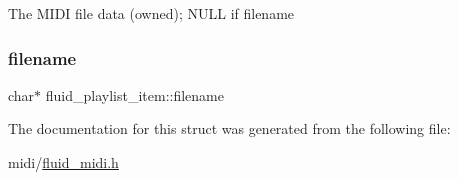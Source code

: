 The M\+I\+DI file data (owned); N\+U\+LL if filename \mbox{\label{structfluid__playlist__item_ae1363ff05cc7535485c858956fbf7eca}} 
\subsubsection{\texorpdfstring{filename}{filename}}
{\footnotesize\ttfamily char$\ast$ fluid\+\_\+playlist\+\_\+item\+::filename}



The documentation for this struct was generated from the following file\+:\begin{DoxyCompactItemize}
\item 
midi/\hyperlink{fluid__midi_8h}{fluid\+\_\+midi.\+h}\end{DoxyCompactItemize}
